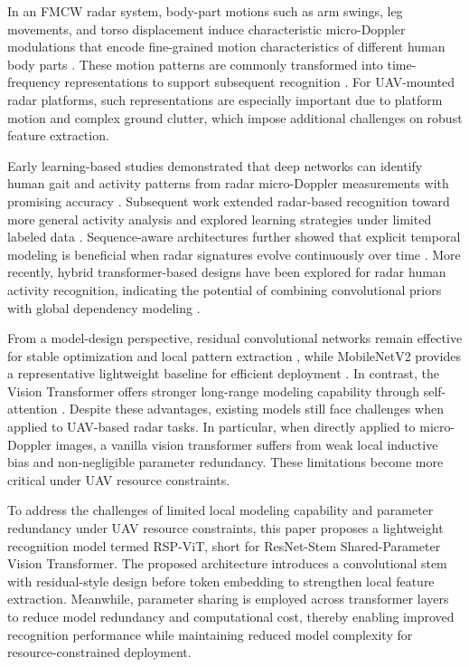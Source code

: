\documentclass{svproc}
\begin{document}
In an FMCW radar system, body-part motions such as arm swings, leg movements, and torso displacement induce characteristic micro-Doppler modulations that encode fine-grained motion characteristics of different human body parts \cite{Chen2006}. These motion patterns are commonly transformed into time-frequency representations to support subsequent recognition \cite{Harmanny2014}. For UAV-mounted radar platforms, such representations are especially important due to platform motion and complex ground clutter, which impose additional challenges on robust feature extraction.

Early learning-based studies demonstrated that deep networks can identify human gait and activity patterns from radar micro-Doppler measurements with promising accuracy \cite{Papanastasiou2021}. Subsequent work extended radar-based recognition toward more general activity analysis and explored learning strategies under limited labeled data \cite{Li2022SemiHAR}. Sequence-aware architectures further showed that explicit temporal modeling is beneficial when radar signatures evolve continuously over time \cite{Du2020SCGRNN}. More recently, hybrid transformer-based designs have been explored for radar human activity recognition, indicating the potential of combining convolutional priors with global dependency modeling \cite{Huan2023LHViT}.

From a model-design perspective, residual convolutional networks remain effective for stable optimization and local pattern extraction \cite{He2016ResNet}, while MobileNetV2 provides a representative lightweight baseline for efficient deployment \cite{Sandler2018MobileNetV2}. In contrast, the Vision Transformer offers stronger long-range modeling capability through self-attention \cite{Dosovitskiy2021ViT}. Despite these advantages, existing models still face challenges when applied to UAV-based radar tasks. In particular, when directly applied to micro-Doppler images, a vanilla vision transformer suffers from weak local inductive bias and non-negligible parameter redundancy. These limitations become more critical under UAV resource constraints.

To address the challenges of limited local modeling capability and parameter redundancy under UAV resource constraints, this paper proposes a lightweight recognition model termed RSP-ViT, short for ResNet-Stem Shared-Parameter Vision Transformer. The proposed architecture introduces a convolutional stem with residual-style design before token embedding to strengthen local feature extraction. Meanwhile, parameter sharing is employed across transformer layers to reduce model redundancy and computational cost, thereby enabling improved recognition performance while maintaining reduced model complexity for resource-constrained deployment.
\end{document}
